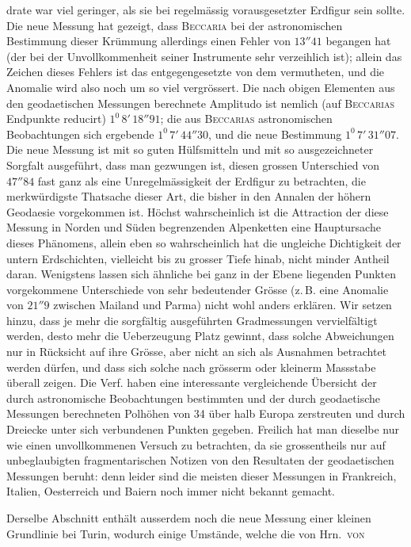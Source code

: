 %
drate war viel geringer, als sie bei regelmässig vorausgesetzter Erdfigur sein sollte. Die neue Messung hat gezeigt, dass \textsc{Beccaria} bei der astronomischen Bestimmung dieser Krümmung allerdings einen Fehler von \(13''41\) begangen hat (der bei der Unvollkommenheit seiner Instrumente sehr verzeihlich ist); allein das Zeichen dieses Fehlers ist das entgegengesetzte von dem vermutheten, und die Anomalie wird also noch um so viel vergrössert. Die nach obigen Elementen aus den geodaetischen Messungen berechnete Amplitudo ist nemlich (auf \textsc{Beccarias} Endpunkte reducirt) \(1^0\,8'\,18''91\); die aus \textsc{Beccarias} astronomischen Beobachtungen sich ergebende \(1^0\,7'\,44''30\), und die neue Bestimmung \(1^0\,7'\,31''07\). Die neue Messung ist mit so guten Hülfsmitteln und mit so ausgezeichneter Sorgfalt ausgeführt, dass man gezwungen ist, diesen grossen Unterschied von \(47''84\) fast ganz als eine Unregelmässigkeit der Erdfigur zu betrachten, die merkwürdigste Thatsache dieser Art, die bisher in den Annalen der höhern Geodaesie vorgekommen ist. Höchst wahrscheinlich ist die Attraction der diese Messung in Norden und Süden begrenzenden Alpenketten eine Hauptursache dieses Phänomens, allein eben so wahrscheinlich hat die ungleiche Dichtigkeit der untern Erdschichten, vielleicht bis zu grosser Tiefe hinab, nicht minder Antheil daran. Wenigstens lassen sich ähnliche bei ganz in der Ebene liegenden Punkten vorgekommene Unterschiede von sehr bedeutender Grösse (z.\,B. eine Anomalie von \(21''9\) zwischen Mailand und Parma) nicht wohl anders erklären. Wir setzen hinzu, dass je mehr die sorgfältig ausgeführten Gradmessungen vervielfältigt werden, desto mehr die Ueberzeugung Platz gewinnt, dass solche Abweichungen nur in Rücksicht auf ihre Grösse, aber nicht an sich als Ausnahmen betrachtet werden dürfen, und dass sich solche nach grösserm oder kleinerm Massstabe überall zeigen. Die Verf. haben eine interessante vergleichende Übersicht der durch astronomische Beobachtungen bestimmten und der durch geodaetische Messungen berechneten Polhöhen von 34 über halb Europa zerstreuten und durch Dreiecke unter sich verbundenen Punkten gegeben. Freilich hat man dieselbe nur wie einen unvollkommenen Versuch zu betrachten, da sie grossentheils nur auf unbeglaubigten fragmentarischen Notizen von den Resultaten der geodaetischen Messungen beruht: denn leider sind die meisten dieser Messungen in Frankreich, Italien, Oesterreich und Baiern noch immer nicht bekannt gemacht.

Derselbe Abschnitt enthält ausserdem noch die neue Messung einer kleinen Grundlinie bei Turin, wodurch einige Umstände, welche die von Hrn.\ \textsc{von}
